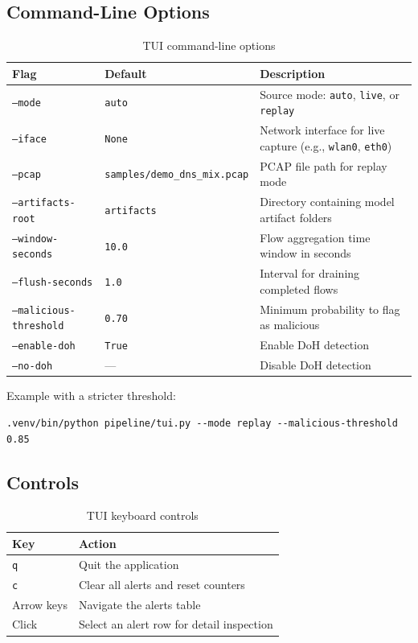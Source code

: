 \documentclass[12pt,a4paper]{article}
\begin{document}
\subsection{Command-Line Options}

\begin{table}[H]
\centering
\begin{tabular}{@{}llp{5.5cm}@{}}
\toprule
\textbf{Flag} & \textbf{Default} & \textbf{Description} \\
\midrule
\texttt{--mode} & \texttt{auto} & Source mode: \texttt{auto}, \texttt{live}, or \texttt{replay} \\
\texttt{--iface} & \texttt{None} & Network interface for live capture (e.g., \texttt{wlan0}, \texttt{eth0}) \\
\texttt{--pcap} & \texttt{samples/demo\_dns\_mix.pcap} & PCAP file path for replay mode \\
\texttt{--artifacts-root} & \texttt{artifacts} & Directory containing model artifact folders \\
\texttt{--window-seconds} & \texttt{10.0} & Flow aggregation time window in seconds \\
\texttt{--flush-seconds} & \texttt{1.0} & Interval for draining completed flows \\
\texttt{--malicious-threshold} & \texttt{0.70} & Minimum probability to flag as malicious \\
\texttt{--enable-doh} & \texttt{True} & Enable DoH detection \\
\texttt{--no-doh} & --- & Disable DoH detection \\
\bottomrule
\end{tabular}
\caption{TUI command-line options}
\end{table}

Example with a stricter threshold:
\begin{lstlisting}
.venv/bin/python pipeline/tui.py --mode replay --malicious-threshold 0.85
\end{lstlisting}

\subsection{Controls}

\begin{table}[H]
\centering
\begin{tabular}{@{}ll@{}}
\toprule
\textbf{Key} & \textbf{Action} \\
\midrule
\texttt{q} & Quit the application \\
\texttt{c} & Clear all alerts and reset counters \\
Arrow keys & Navigate the alerts table \\
Click & Select an alert row for detail inspection \\
\bottomrule
\end{tabular}
\caption{TUI keyboard controls}
\end{table}
\end{document}
